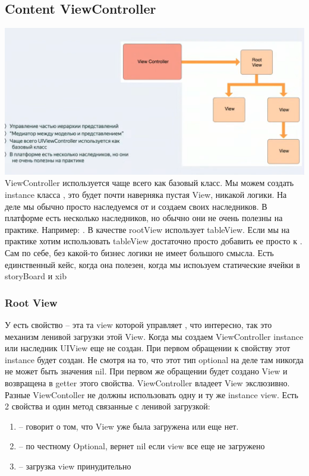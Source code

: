\documentclass{article}
\begin{document}
        \subsection{Content ViewController}
        \includegraphics[scale = 0.5]{pic/Снимок экрана 2023-08-02 в 20.41.43.png}
        \newline
        ViewController используется чаще всего как базовый класс. Мы можем создать instance класса , это будет почти наверняка пустая View, никакой логики. На деле мы обычно просто наследуемся от  и создаем своих наследников. В платформе есть несколько наследников, но обычно они не очень полезны на практике. Например: . В качестве rootView использует tableView. Если мы на практике хотим использовать tableView достаточно просто добавить ее просто к . Сам по себе, без какой-то бизнес логики не имеет большого смысла. Есть единственный кейс, когда она полезен, когда мы испоьзуем статические ячейки в storyBoard и xib
        \subsubsection{Root View}
        У  есть свойство  -- эта та view которой управляет , что интересно, так это механизм ленивой загрузки этой View. Когда мы создаем ViewController instance или наследник UIView еще не создан. При первом обращении к свойству  этот instance будет создан. Не смотря на то, что этот тип optional на деле там никогда не может быть значения nil. При первом же обращении будет создано View и возвращена в getter этого свойства. ViewController владеет View экслюзивно. Разные ViewContoller не должны использовать одну и ту же instance view. 
        \newline
        Есть 2 свойства и один метод связанные с ленивой загрузкой: 
        \begin{enumerate}
            \item {} -- говорит о том, что View уже была загружена или еще нет. 
            \item {} -- по честному Optional, вернет nil если view все еще не загружено
            \item {} -- загрузка view принудительно
        \end{enumerate}
\end{document}
